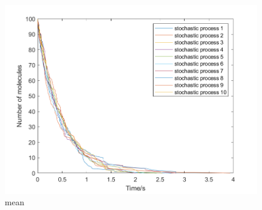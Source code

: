 \documentclass{article}
\begin{document}
\begin{figure}[htbp]
\centering
\includegraphics[width=\linewidth]{graph/mean1.png}
\caption{mean}
\end{figure}
\clearpage
\end{document}
